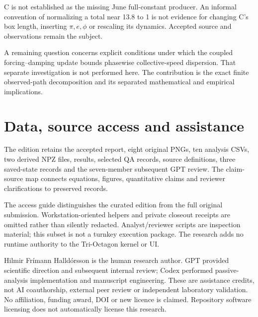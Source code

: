 \documentclass[11pt,a4paper]{article}
\begin{document}
C is not established as the missing June full-constant producer. An informal convention of normalizing a total near 13.8 to 1 is not evidence for changing C's box length, inserting $\pi,e,\phi$ or rescaling its dynamics. Accepted source and observations remain the subject.

A remaining question concerns explicit conditions under which the coupled forcing--damping update bounds phasewise collective-speed dispersion. That separate investigation is not performed here. The contribution is the exact finite observed-path decomposition and its separated mathematical and empirical implications.

\clearpage
\section*{Data, source access and assistance}
The edition retains the accepted report, eight original PNGs, ten analysis CSVs, two derived NPZ files, results, selected QA records, source definitions, three saved-state records and the seven-member subsequent GPT review. The claim-source map connects equations, figures, quantitative claims and reviewer clarifications to preserved records.

The access guide distinguishes the curated edition from the full original submission. Workstation-oriented helpers and private closeout receipts are omitted rather than silently redacted. Analyst/reviewer scripts are inspection material; this subset is not a turnkey execution package. The research adds no runtime authority to the Tri-Octagon kernel or UI.

Hilmir Frímann Halldórsson is the human research author. GPT provided scientific direction and subsequent internal review; Codex performed passive-analysis implementation and manuscript engineering. These are assistance credits, not AI coauthorship, external peer review or independent laboratory validation. No affiliation, funding award, DOI or new licence is claimed. Repository software licensing does not automatically license this research.
\end{document}
